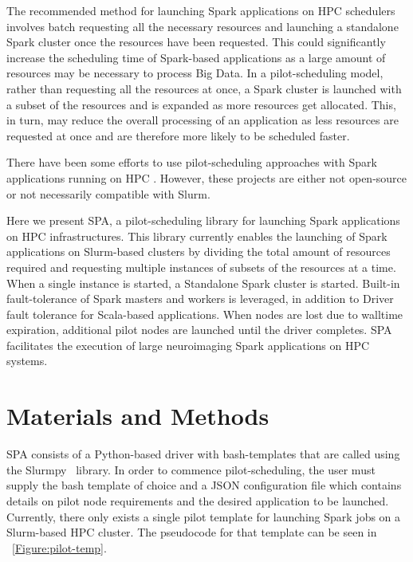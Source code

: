 \documentclass{IEEEtran}
\newcommand{\todo}[1]{\marginpar{\parbox{18mm}{\flushleft\tiny\color{red}\textbf{TODO}:
      #1}}}
\begin{document}
The recommended method for launching Spark applications on HPC schedulers 
involves batch requesting all the necessary resources and launching a standalone
Spark cluster once the resources have been requested. This could significantly increase
the scheduling time of Spark-based applications as a large amount of resources 
may be necessary to process Big Data. In a pilot-scheduling model, rather than requesting all the resources 
at once, a Spark cluster is launched with a subset of the resources and is expanded as 
more resources get allocated. This, in turn, may reduce the overall processing of
an application as less resources are requested at once and are therefore more likely
to be scheduled faster.

There have been some efforts to use pilot-scheduling approaches with Spark applications
running on HPC \cite{jha and spark on pbs paper}. However, these projects are either
not open-source or not necessarily compatible with Slurm.

Here we present SPA, a pilot-scheduling library for launching Spark applications 
on HPC infrastructures. This library currently enables the launching of Spark applications
on Slurm-based clusters by dividing the total amount of resources required and requesting
multiple instances of subsets of the resources at a time. When a single 
instance is started, a Standalone Spark cluster is started. Built-in 
fault-tolerance of Spark masters and workers is leveraged, in addition 
to Driver fault tolerance for Scala-based applications. When nodes are 
lost due to walltime expiration, additional pilot nodes are launched 
until the driver completes. SPA facilitates the execution of large 
neuroimaging Spark applications on HPC systems.



\section{Materials and Methods}\label{sec:methods}
    SPA consists of a Python-based driver with bash-templates that are called 
    using the Slurmpy~\cite{slurmpy} library. In order to commence pilot-scheduling,
    the user must supply the bash template of choice and a JSON configuration 
    file which contains details on pilot node requirements and the desired application
    to be launched. Currently, there only exists a single pilot template for launching
    Spark jobs on a Slurm-based HPC cluster. The pseudocode for that template can 
    be seen in ~\ref{Figure:pilot-temp}.
    \todo{walltime parameter of workflow}
\end{document}
